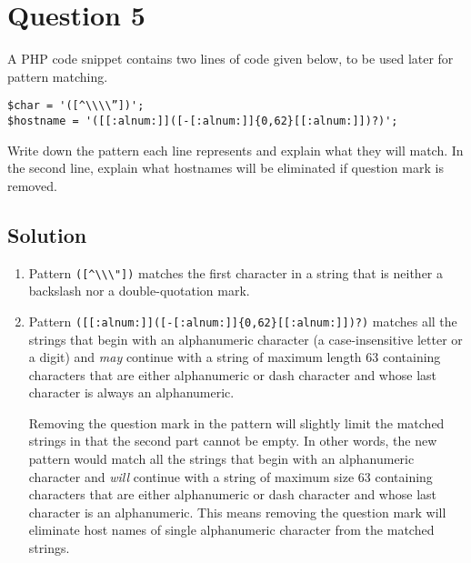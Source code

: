 
\section*{Question 5}

A PHP code snippet contains two lines of code given below, to be used later for pattern matching. 
\begin{lstlisting}
$char = '([^\\\\”])';
$hostname = '([[:alnum:]]([-[:alnum:]]{0,62}[[:alnum:]])?)';
\end{lstlisting}
Write down the pattern each line represents and explain what they will match. In the second line, explain what hostnames will be eliminated if question mark is removed.

\subsection*{Solution}

\begin{enumerate}[label=(\alph*)]
\item Pattern \verb+([^\\\"])+ matches the first character in a string that is neither a backslash nor a double-quotation mark.

\item Pattern \verb+([[:alnum:]]([-[:alnum:]]{0,62}[[:alnum:]])?)+ matches all the strings that begin with an alphanumeric character (a case-insensitive letter or a digit) and \textit{may} continue with a string of maximum length 63 containing characters that are either alphanumeric or dash character and whose last character is always an alphanumeric.

Removing the question mark in the pattern will slightly limit the matched strings in that the second part cannot be empty. In other words, the new pattern would match all the strings that begin with an alphanumeric character and \textit{will} continue with a string of maximum size 63 containing characters that are either alphanumeric or dash character and whose last character is an alphanumeric. This means removing the question mark will eliminate host names of single alphanumeric character from the matched strings.

\end{enumerate}

